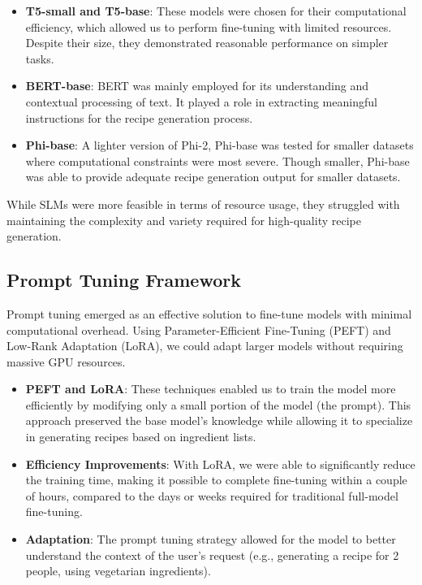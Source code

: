\documentclass[letterpaper,11pt]{report}
\begin{document}
\begin{itemize}
\item \textbf{T5-small and T5-base}: These models were chosen for their computational efficiency, which allowed us to perform fine-tuning with limited resources. Despite their size, they demonstrated reasonable performance on simpler tasks.
\item \textbf{BERT-base}: BERT was mainly employed for its understanding and contextual processing of text. It played a role in extracting meaningful instructions for the recipe generation process.
\item \textbf{Phi-base}: A lighter version of Phi-2, Phi-base was tested for smaller datasets where computational constraints were most severe. Though smaller, Phi-base was able to provide adequate recipe generation output for smaller datasets.
\end{itemize}

While SLMs were more feasible in terms of resource usage, they struggled with maintaining the complexity and variety required for high-quality recipe generation.

\subsection{Prompt Tuning Framework}

Prompt tuning emerged as an effective solution to fine-tune models with minimal computational overhead. Using Parameter-Efficient Fine-Tuning (PEFT) and Low-Rank Adaptation (LoRA), we could adapt larger models without requiring massive GPU resources.

\begin{itemize}
\item \textbf{PEFT and LoRA}: These techniques enabled us to train the model more efficiently by modifying only a small portion of the model (the prompt). This approach preserved the base model's knowledge while allowing it to specialize in generating recipes based on ingredient lists.
\item \textbf{Efficiency Improvements}: With LoRA, we were able to significantly reduce the training time, making it possible to complete fine-tuning within a couple of hours, compared to the days or weeks required for traditional full-model fine-tuning.
\item \textbf{Adaptation}: The prompt tuning strategy allowed for the model to better understand the context of the user’s request (e.g., generating a recipe for 2 people, using vegetarian ingredients).
\end{itemize}
\end{document}
